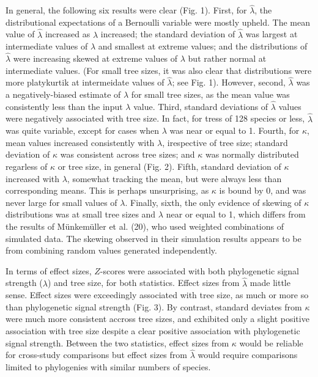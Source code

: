 \documentclass[]{article}
\begin{document}
In general, the following six results were clear (Fig. 1). First, for
\(\hat{\lambda}\), the distributional expectations of a Bernoulli
variable were mostly upheld. The mean value of \(\hat{\lambda}\)
increased as \(\lambda\) increased; the standard deviation of
\(\hat{\lambda}\) was largest at intermediate values of \(\lambda\) and
smallest at extreme values; and the distributions of \(\hat{\lambda}\)
were increasing skewed at extreme values of \(\lambda\) but rather
normal at intermediate values. (For small tree sizes, it was also clear
that distributions were more platykurtik at intermeidate values of
\(\hat{\lambda}\); see Fig. 1). However, second, \(\hat{\lambda}\) was a
negatively-biased estimate of \(\lambda\) for small tree sizes, as the
mean value was consistently less than the input \(\lambda\) value.
Third, standard deviations of \(\hat{\lambda}\) values were negatively
associated with tree size. In fact, for tress of 128 species or less,
\(\hat{\lambda}\) was quite variable, except for cases when \(\lambda\)
was near or equal to 1. Fourth, for \(\kappa\), mean values increased
consistently with \(\lambda\), irespective of tree size; standard
deviation of \(\kappa\) was consistent across tree sizes; and \(\kappa\)
was normally distributed regarless of \(\kappa\) or tree size, in
general (Fig. 2). Fifth, standard deviation of \(\kappa\) increased with
\(\lambda\), somewhat tracking the mean, but were always less than
corresponding means. This is perhaps unsurprising, as \(\kappa\) is
bound by 0, and was never large for small values of \(\lambda\).
Finally, sixth, the only evidence of skewing of \(\kappa\) distributions
was at small tree sizes and \(\lambda\) near or equal to 1, which
differs from the results of Münkemüller et al. (20), who used weighted
combinations of simulated data. The skewing observed in their simulation
results appears to be from combining random values generated
independently. \hfill\break

In terms of effect sizes, \(Z\)-scores were associated with both
phylogenetic signal strength (\(\lambda\)) and tree size, for both
statistics. Effect sizes from \(\hat{\lambda}\) made little sense.
Effect sizes were exceedingly associated with tree size, as much or more
so than phylogenetic signal strength (Fig. 3). By contrast, standard
deviates from \(\kappa\) were much more consistent accross tree sizes,
and exhibited only a slight positive association with tree size despite
a clear positive association with phylogenetic signal strength. Between
the two statistics, effect sizes from \(\kappa\) would be reliable for
cross-study comparisons but effect sizes from \(\hat{\lambda}\) would
require comparisons limited to phylogenies with similar numbers of
species.
\end{document}

